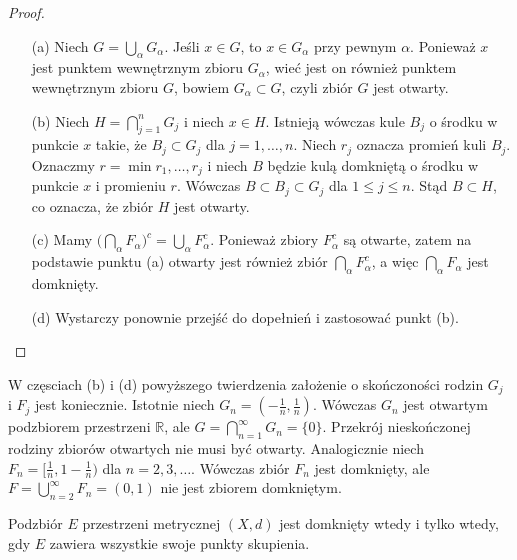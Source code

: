 \documentclass[leqno]{article}
\begin{document}
\begin{justify}
\begin{proof}
    \begin{itemize}
        \item [(a)] Niech $G = \bigcup\limits_\alpha G_\alpha$. Jeśli $x \in G$, to $x \in G_\alpha$ przy pewnym $\alpha$. Ponieważ
        $x$ jest punktem wewnętrznym zbioru $G_\alpha$, wieć jest on również punktem wewnętrznym zbioru $G$, bowiem $G_\alpha \subset G$, czyli zbiór $G$ jest otwarty.
        \item [(b)] 
            Niech $H = \bigcap_{j=1}^{n}G_j$ i niech $x \in H$. Istnieją wówczas kule $B_j$ o środku w punkcie $x$ takie, że $B_j \subset G_j$ dla $j = 1, \ldots, n$.
            Niech $r_j$ oznacza promień kuli $B_j$. Oznaczmy $r = \min{r_1, \ldots, r_j}$ i niech $B$ będzie kulą domkniętą o środku w punkcie $x$ i promieniu $r$.
            Wówczas $B \subset B_j \subset G_j$ dla $1 \leqslant j \leqslant n$. Stąd $B \subset H$, co oznacza, że zbiór $H$ jest otwarty.
        \item [(c)]
            Mamy ${\Big(\bigcap\limits_{\alpha}F_{\alpha}\Big)}^c = \bigcup\limits_\alpha F_\alpha^c$. Ponieważ zbiory $F_\alpha^c$ są otwarte, zatem na podstawie punktu (a) otwarty jest
            również zbiór $\bigcap\limits_\alpha F_\alpha^c$, a więc $\bigcap\limits_\alpha F_\alpha$ jest domknięty.
        \item [(d)]
            Wystarczy ponownie przejść do dopełnień i zastosować punkt (b).
    \end{itemize}
\end{proof}

\begin{ex}
    W częsciach (b) i (d) powyższego twierdzenia założenie o skończoności rodzin $G_j$ i $F_j$ jest koniecznie.
    Istotnie niech $G_n = (-\frac{1}{n}, \frac{1}{n})$. Wówczas $G_n$ jest otwartym podzbiorem przestrzeni $\mathbb{R}$, ale
    $G = \bigcap\limits_{n=1}^{\infty}G_n = \{0\}$. Przekrój nieskończonej rodziny zbiorów otwartych nie musi być otwarty. 
    Analogicznie niech $F_n = [\frac{1}{n}, 1 - \frac{1}{n})$ dla $n = 2,3,\ldots$. Wówczas zbiór $F_n$ jest domknięty, ale
    $F = \bigcup\limits_{n=2}^{\infty}F_n = (0, 1)$ nie jest zbiorem domkniętym. 
\end{ex}

\begin{theorem}
{
    Podzbiór $E$ przestrzeni metrycznej $(X, d)$ jest domknięty wtedy i tylko wtedy, gdy $E$ zawiera wszystkie swoje punkty skupienia.
}
\end{theorem}


\end{justify}
\end{document}
